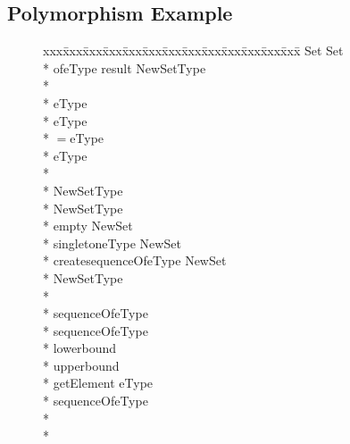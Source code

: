 \subsection{Polymorphism Example}
\label{polymorphismexample}
\begin{figure}[tbp]
\begin{center}
{\small\it\begin{minipage}{\textwidth}\begin{tabbing}
xxx\=xxx\=xxx\=xxx\=xxx\=xxx\=xxx\=xxx\=xxx\=xxx\=xxx\=xxx\=xxx\=\+\kill%
 Set \assign{}   Set\+\\*{}%
    of\/\LB{}eType \CO{} \/\RB{} \returns{} \/\LB{}result \CO{} NewSetType\/\RB{}\+\\*{}%
    \+\\*{}%
      eType \matches\+\\*{}%
	  eType\+\\*{}%
	   $=$\/\LB{}eType\/\RB{} \returns{} \/\LB{}\/\RB{}\-\\*{}%
	 eType\-\-\\*{}%
    \+\\*{}%
      NewSetType \assign{}\+\\*{}%
	  NewSetType\+\\*{}%
	   empty \returns{} \/\LB{}NewSet\/\RB{}\\*{}%
	   singleton\/\LB{}eType\/\RB{} \returns{} \/\LB{}NewSet\/\RB{}\\*{}%
	   create\/\LB{}sequenceOfeType\/\RB{} \returns{} \/\LB{}NewSet\/\RB{}\-\\*{}%
	 NewSetType\-\-\\*{}%
    \+\\*{}%
      sequenceOfeType \assign{}\+\\*{}%
	  sequenceOfeType\+\\*{}%
	   lowerbound \returns{} \/\LB{}\/\RB{}\\*{}%
	   upperbound \returns{} \/\LB{}\/\RB{}\\*{}%
	   getElement\/\LB{}\/\RB{} \returns{} \/\LB{}eType\/\RB{}\-\\*{}%
	 sequenceOfeType\-\-\\*{}%
    \+\\*{}%

\end{tabbing}
\end{minipage}}
\end{center}
\end{figure}
